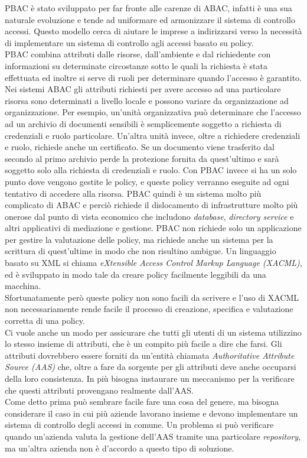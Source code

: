 PBAC è stato sviluppato per far fronte alle carenze di ABAC, infatti è una sua naturale evoluzione e tende ad uniformare ed armonizzare il sistema di controllo accessi.
Questo modello cerca di aiutare le imprese a indirizzarsi verso la necessità di implementare un sistema di controllo agli accessi basato su policy.\\
PBAC combina attributi dalle risorse, dall'ambiente e dal richiedente con informazioni su determinate circostanze sotto le quali la richiesta è stata effettuata ed inoltre si serve di 
ruoli per determinare quando l'accesso è garantito.\\
Nei sistemi ABAC gli attributi richiesti per avere accesso ad una particolare risorsa sono determinati a livello locale e possono variare da organizzazione ad organizzazione.
Per esempio, un'unità organizzativa può determinare che l'accesso ad un archivio di documenti sensibili è semplicemente soggetto a richiesta di credenziali e ruolo particolare.
Un'altra unità invece, oltre a richiedere credenziali e ruolo, richiede anche un certificato. Se un documento viene trasferito dal secondo al primo archivio perde la protezione fornita da quest'ultimo e sarà soggetto solo alla richiesta di credenziali e ruolo.
Con PBAC invece si ha un solo punto dove vengono gestite le policy, e queste policy verranno eseguite ad ogni tentativo di accedere alla risorsa.
PBAC quindi è un sistema molto più complicato di ABAC e perciò richiede il dislocamento di infrastrutture molto più onerose dal punto di vista economico che includono \textit{database}, \textit{directory service} e altri applicativi di mediazione e gestione.
PBAC non richiede solo un applicazione per gestire la valutazione delle policy, ma richiede anche un sistema per la scrittura di quest'ultime in modo che non risultino ambigue.
Un linguaggio basato su XML si chiama
 \textit{eXtensible Access Control Markup Language (XACML)}, ed è sviluppato in modo tale da creare policy facilmente leggibili da una macchina.\\
Sfortunatamente però queste policy non sono facili da scrivere e l'uso di XACML non necessariamente rende facile il processo di creazione, specifica e valutazione corretta di una policy.\\
Ci vuole anche un modo per assicurare che tutti gli utenti di un sistema utilizzino lo stesso insieme di attributi, che è un compito più facile a dire che farsi.
Gli attributi dovrebbero essere forniti da un'entità chiamata \textit{Authoritative Attribute Source (AAS)} che, oltre a fare da sorgente per gli attributi deve anche occuparsi della loro consistenza.
In più bisogna instaurare un meccanismo per la verificare che questi attributi provengano realmente dall'AAS.\\
Come detto prima può sembrare facile fare una cosa del genere, ma bisogna considerare il caso in cui più aziende lavorano insieme e devono implementare un sistema di controllo degli accessi in comune. Un problema si può verificare quando un'azienda valuta la gestione dell'AAS tramite una particolare \textit{repository}, ma un'altra azienda non è d'accordo a questo tipo di soluzione.


